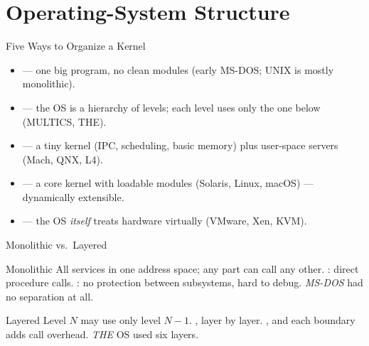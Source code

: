\documentclass[aspectratio=169]{beamer}
\begin{document}

\section{Operating-System Structure}

\begin{frame}{Five Ways to Organize a Kernel}
  \begin{itemize}
    \item {} --- one big program, no clean modules
      (early MS-DOS; UNIX is mostly monolithic).
    \item {} --- the OS is a hierarchy of levels; each level uses
      only the one below (MULTICS, THE).
    \item {} --- a tiny kernel (IPC, scheduling, basic memory)
      plus user-space servers (Mach, QNX, L4).
    \item {} --- a core kernel with loadable modules
      (Solaris, Linux, macOS) --- dynamically extensible.
    \item {} --- the OS \emph{itself} treats hardware
      virtually (VMware, Xen, KVM).
  \end{itemize}
  \vspace{0.2cm}
\end{frame}

\begin{frame}{Monolithic vs.\ Layered}
  \begin{block}{Monolithic}
    All services in one address space; any part can call any other. :
    direct procedure calls. : no protection between subsystems, hard
    to debug. \emph{MS-DOS} had no separation at all.
  \end{block}
  \begin{block}{Layered}
    Level $N$ may use only level $N-1$. ,
    layer by layer. , and each boundary
    adds call overhead. \emph{THE} OS used six layers.
  \end{block}
  \vspace{0.15cm}
\end{frame}
\end{document}
